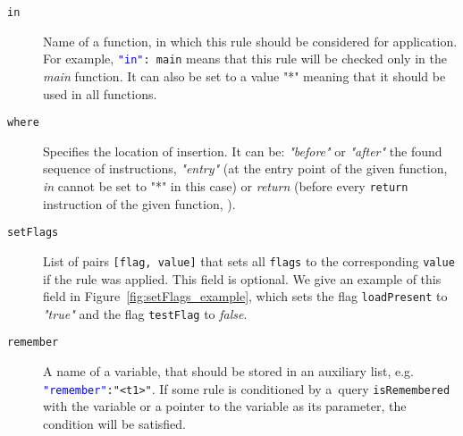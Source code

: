 \begin{description}
    \item[\texttt{in}] Name of a function, in which this rule should be
    considered for application. For example, \texttt{\textcolor{blue}{"in"}:
    main} means that this rule will be checked only in the \emph{main}
    function. It can also be set to a value "*" meaning that it should be used
    in all functions.

    \item[\texttt{where}] Specifies the location of insertion. It can be:
    \emph{"before"} or \emph{"after"} the found sequence of instructions,
    \emph{"entry"} (at the entry point of the given function, \emph{in}
    cannot be set to "*" in this case) or \emph{return} (before every
    \texttt{return} instruction of the given function, ).

    \item[\texttt{setFlags}] List of pairs \texttt{[flag, value]} that sets all
    \texttt{flags} to the corresponding \texttt{value} if the rule was applied.
    This field is optional. We give an example of this field in
    Figure~\ref{fig:setFlags_example}, which sets the flag \texttt{loadPresent}
    to \emph{"true"} and the flag \texttt{testFlag} to \emph{false}.

     \begin{minipage}{\linewidth}
        
        \label{fig:setFlags_example}
      \end{minipage}

    \item[\texttt{remember}] A name of a variable, that should be stored in an
    auxiliary list, e.g. \texttt{\textcolor{blue}{"remember"}:"<t1>"}. If some
    rule is conditioned by a~query \texttt{isRemembered} with the variable or a
    pointer to the variable as its parameter, the condition will be satisfied.
\end{description}

\medskip

